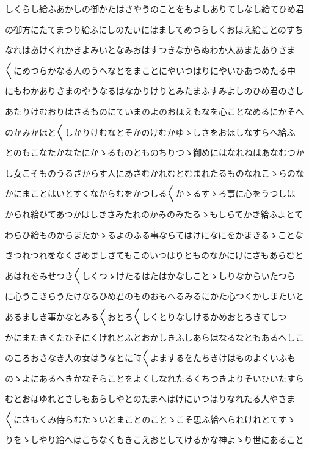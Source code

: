 \documentclass[a4paper,11pt,landscape]{ltjtarticle}
\begin{document}
しくらし給ふあかしの御かたはさやうのことをもよしありてしなし給てひめ君
\par\medskip
の御方にたてまつり給ふにしのたいにはましてめつらしくおほえ給ことのすち
\par\medskip
なれはあけくれかきよみいとなみおはすつきなからぬわか人あまたありさま
\par\medskip
〱にめつらかなる人のうへなとをまことにやいつはりにやいひあつめたる中
\par\medskip
にもわかありさまのやうなるはなかりけりとみたまふすみよしのひめ君のさし
\par\medskip
あたりけむおりはさるものにていまのよのおほえもなを心ことなめるにかそへ
\par\medskip
のかみかほと〱しかりけむなとそかのけむかゆゝしさをおほしなすらへ給ふ
\par\medskip
とのもこなたかなたにかゝるものとものちりつゝ御めにはなれねはあなむつか
\par\medskip
し女こそものうるさからす人にあさむかれむとむまれたるものなれこゝらのな
\par\medskip
かにまことはいとすくなからむをかつしる〱かゝるすゝろ事に心をうつしは
\par\medskip
かられ給ひてあつかはしきさみたれのかみのみたるゝもしらてかき給ふよとて
\par\medskip
わらひ給ものからまたかゝるよのふる事ならてはけになにをかまきるゝことな
\par\medskip
きつれつれをなくさめましさてもこのいつはりとものなかにけにさもあらむと
\par\medskip
あはれをみせつき〱しくつゝけたるはたはかなしことゝしりなからいたつら
\par\medskip
に心うこきらうたけなるひめ君のものおもへるみるにかた心つくかしまたいと
\par\medskip
あるましき事かなとみる〱おとろ〱しくとりなしけるかめおとろきてしつ
\par\medskip
かにまたきくたひそにくけれとふとおかしきふしあらはなるなともあるへしこ
\par\medskip
のころおさなき人の女はうなとに時〱よまするをたちきけはものよくいふも
\par\medskip
のゝよにあるへきかなそらことをよくしなれたるくちつきよりそいひいたすら
\par\medskip
むとおほゆれとさしもあらしやとのたまへはけにいつはりなれたる人やさま
\par\medskip
〱にさもくみ侍らむたゝいとまことのことゝこそ思ふ給へられけれとてすゝ
\par\medskip
りをゝしやり給へはこちなくもきこえおとしてけるかな神よゝり世にあること
\end{document}
